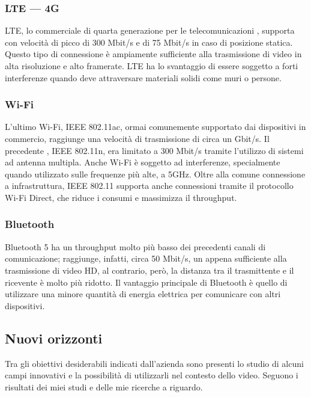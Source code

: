 		\subsubsection{LTE --- 4G}
			\gls{LTE}, lo  commerciale di quarta generazione per le telecomunicazioni , supporta  con velocità di picco di 300 Mbit/s e  di 75 Mbit/s in caso di posizione statica. Questo tipo di connessione è ampiamente sufficiente alla trasmissione di video in alta risoluzione e alto framerate. \gls{LTE} ha lo svantaggio di essere soggetto a forti interferenze quando deve attraversare materiali solidi come muri o persone.
		\subsubsection{Wi-Fi}
			L'ultimo  Wi-Fi, \acrshort{IEEE} 802.11ac, ormai comunemente supportato dai dispositivi  in commercio, raggiunge una velocità di trasmissione di circa un Gbit/s. Il precedente , \acrshort{IEEE} 802.11n, era limitato a 300 Mbit/s tramite l'utilizzo di sistemi ad antenna multipla. Anche Wi-Fi è soggetto ad interferenze, specialmente quando utilizzato sulle frequenze più alte, a 5GHz. Oltre alla comune connessione a infrastruttura, \acrshort{IEEE} 802.11 supporta anche connessioni  tramite il protocollo Wi-Fi Direct, che riduce i consumi e massimizza il throughput.
		\subsubsection{Bluetooth}
			Bluetooth 5 ha un throughput molto più basso dei precedenti canali di comunicazione; raggiunge, infatti, circa 50 Mbit/s, un  appena sufficiente alla trasmissione di video HD, al contrario, però, la distanza tra il trasmittente e il ricevente è molto più ridotto. Il vantaggio principale di Bluetooth è quello di utilizzare una minore quantità di energia elettrica per comunicare con altri dispositivi.

\subsection{Nuovi orizzonti}
Tra gli obiettivi desiderabili indicati dall'azienda sono presenti lo studio di alcuni campi innovativi e la possibilità di utilizzarli nel contesto dello  video. Seguono i risultati dei miei studi e delle mie ricerche a riguardo.

